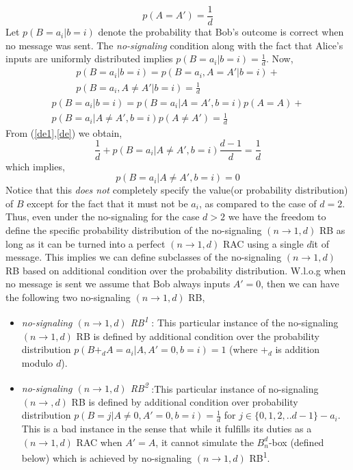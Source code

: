 \documentclass[%
 reprint,
 amsmath,amssymb,
 aps,
]{revtex4-1}
\begin{document}
\begin{equation}\label{de}
p(A=A')=\frac{1}{d}
\end{equation}
Let $p(B=a_i|b=i)$ denote the probability that Bob's outcome is correct when no message was sent. The \textit{no-signaling} condition along with the fact that Alice's inputs are uniformly distributed implies $p(B=a_i|b=i)=\frac{1}{d}$. Now, 
\begin{multline}
p(B=a_i|b=i)=p(B=a_i,A=A'|b=i)+ \\ p(B=a_i,A\neq A'|b=i)=\frac{1}{d}
\end{multline}
\begin{multline}
p(B=a_i|b=i)=p(B=a_i|A=A',b=i)p(A=A)+ \\ p(B=a_i|A\neq A',b=i)p(A\neq A')=\frac{1}{d}
\end{multline}
From (\ref{de1},\ref{de}) we obtain, 
\begin{equation}
\frac{1}{d}+p(B=a_i|A\neq A',b=i)\frac{d-1}{d}=\frac{1}{d}
\end{equation}
which implies, 
\begin{equation}\label{imp}
p(B=a_i|A\neq A',b=i)=0
\end{equation}
Notice that this \textit{does not} completely specify the value(or probability distribution) of $B$ except for the fact that it must not be $a_i$, as compared to the case of $d=2$. Thus, even under the no-signaling for the case $d>2$ we have the freedom to define the specific probability distribution of the no-signaling $(n\rightarrow 1,d)$ RB as long as it can be turned into a perfect $(n\rightarrow 1,d)$ RAC using a single $d$it of message. This implies we can define subclasses of the no-signaling $(n\rightarrow 1,d)$ RB based on additional condition over the probability distribution. W.l.o.g when no message is sent we assume that Bob always inputs $A'=0$, then we can have the following two no-signaling $(n\rightarrow 1,d)$ RB,
\begin{itemize}
\item \textit{no-signaling $(n\rightarrow 1,d)$ RB\textsuperscript{1}} : This particular instance of the no-signaling $(n\rightarrow1,d)$ RB is defined by additional condition over the probability distribution $p(B+_d A=a_i|A,A'=0,b=i)=1$  (where $+_d$  is addition modulo $d$).
\item \textit{no-signaling $(n\rightarrow 1,d)$ RB\textsuperscript{2}} :This particular instance of no-signaling $(n\rightarrow,d)$ RB is defined by additional condition over probability distribution $p(B=j|A\neq0,A'=0,b=i)=\frac{1}{d}$ for $j\in\{0,1,2,..d-1\}-{a_i}$. This is a bad instance in the sense that while it fulfills its duties as a $(n\rightarrow 1,d)$ RAC when $A'=A$, it cannot simulate the $B_n^d$-box (defined below) which is achieved by no-signaling $(n\rightarrow 1,d)$ RB\textsuperscript{1}. 
\end{itemize}
\end{document}
